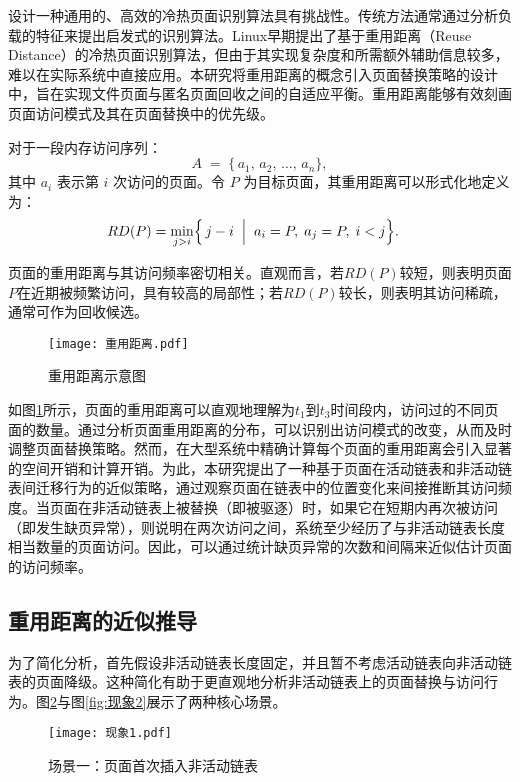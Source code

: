 设计一种通用的、高效的冷热页面识别算法具有挑战性。传统方法通常通过分析负载的特征来提出启发式的识别算法。Linux早期提出了基于重用距离（Reuse Distance）的冷热页面识别算法，但由于其实现复杂度和所需额外辅助信息较多，难以在实际系统中直接应用。本研究将重用距离的概念引入页面替换策略的设计中，旨在实现文件页面与匿名页面回收之间的自适应平衡。重用距离能够有效刻画页面访问模式及其在页面替换中的优先级。

对于一段内存访问序列：
\[
  A \;=\;\{\,a_1,\,a_2,\,\dots,\,a_n\},
\]
其中 \(a_i\) 表示第 \(i\) 次访问的页面。令 \(P\) 为目标页面，其重用距离可以形式化地定义为：
\begin{align}
\label{eq:rd_def}
  RD(P) 
  &= 
  \min_{j>i}\Bigl\{\,j - i
    \;\Bigm|\;
    a_i = P,\;
    a_j = P,\;
    i < j
  \Bigr\}.
\end{align}

页面的重用距离与其访问频率密切相关。直观而言，若\(RD(P)\)较短，则表明页面\(P\)在近期被频繁访问，具有较高的局部性；若\(RD(P)\)较长，则表明其访问稀疏，通常可作为回收候选。

\begin{figure}[htbp]
  \centering
  \texttt{[image: 重用距离.pdf]}
  \caption{重用距离示意图}
  \label{fig:refault_distance}
\end{figure}

如图\ref{fig:refault_distance}所示，页面的重用距离可以直观地理解为\(t_1\)到\(t_3\)时间段内，访问过的不同页面的数量。通过分析页面重用距离的分布，可以识别出访问模式的改变，从而及时调整页面替换策略。然而，在大型系统中精确计算每个页面的重用距离会引入显著的空间开销和计算开销。为此，本研究提出了一种基于页面在活动链表和非活动链表间迁移行为的近似策略，通过观察页面在链表中的位置变化来间接推断其访问频度。当页面在非活动链表上被替换（即被驱逐）时，如果它在短期内再次被访问（即发生缺页异常），则说明在两次访问之间，系统至少经历了与非活动链表长度相当数量的页面访问。因此，可以通过统计缺页异常的次数和间隔来近似估计页面的访问频率。

\subsection{重用距离的近似推导}

为了简化分析，首先假设非活动链表长度固定，并且暂不考虑活动链表向非活动链表的页面降级。这种简化有助于更直观地分析非活动链表上的页面替换与访问行为。图\ref{fig:现象1}与图\ref{fig:现象2}展示了两种核心场景。

\begin{figure}[htbp]
  \centering
  \texttt{[image: 现象1.pdf]}
  \caption{场景一：页面首次插入非活动链表}
  \label{fig:现象1}
\end{figure}

